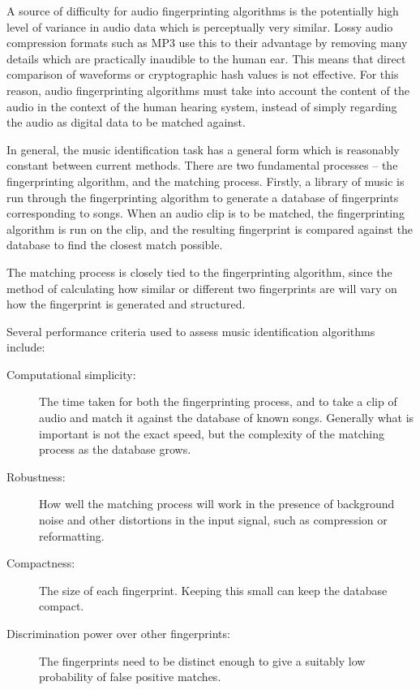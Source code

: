 \documentclass[12pt]{article}
\begin{document}
A source of difficulty for audio fingerprinting algorithms is the potentially high level of variance in audio data which is perceptually very similar. Lossy audio compression formats such as MP3 use this to their advantage by removing many details which are practically inaudible to the human ear. This means that direct comparison of waveforms or cryptographic hash values is not effective. For this reason, audio fingerprinting algorithms must take into account the content of the audio in the context of the human hearing system, instead of simply regarding the audio as digital data to be matched against.

In general, the music identification task has a general form which is reasonably constant between current methods. There are two fundamental processes -- the fingerprinting algorithm, and the matching process. Firstly, a library of music is run through the fingerprinting algorithm to generate a database of fingerprints corresponding to songs. When an audio clip is to be matched, the fingerprinting algorithm is run on the clip, and the resulting fingerprint is compared against the database to find the closest match possible.

The matching process is closely tied to the fingerprinting algorithm, since the method of calculating how similar or different two fingerprints are will vary on how the fingerprint is generated and structured.

Several performance criteria used to assess music identification algorithms include:

\begin{description}

\item [Computational simplicity:] The time taken for both the fingerprinting process, and to take a clip of audio and match it against the database of known songs. Generally what is important is not the exact speed, but the complexity of the matching process as the database grows.

\item [Robustness:] How well the matching process will work in the presence of background noise and other distortions in the input signal, such as compression or reformatting.

\item [Compactness:] The size of each fingerprint. Keeping this small can keep the database compact.

\item [Discrimination power over other fingerprints:] The fingerprints need to be distinct enough to give a suitably low probability of false positive matches.

\end{description}
\end{document}
